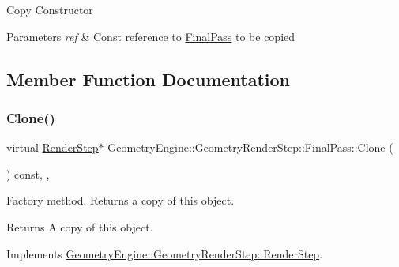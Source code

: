 Copy Constructor 
\begin{DoxyParams}{Parameters}
{\em ref} & Const reference to \mbox{\hyperlink{class_geometry_engine_1_1_geometry_render_step_1_1_final_pass}{Final\+Pass}} to be copied \\
\hline
\end{DoxyParams}


\subsection{Member Function Documentation}
\mbox{\label{class_geometry_engine_1_1_geometry_render_step_1_1_final_pass_a6633ed9c32944cc390d2b0ab32225845}} 
\subsubsection{\texorpdfstring{Clone()}{Clone()}}
{\footnotesize\ttfamily virtual \mbox{\hyperlink{class_geometry_engine_1_1_geometry_render_step_1_1_render_step}{Render\+Step}}$\ast$ Geometry\+Engine\+::\+Geometry\+Render\+Step\+::\+Final\+Pass\+::\+Clone (\begin{DoxyParamCaption}{ }\end{DoxyParamCaption}) const\hspace{0.3cm}{\ttfamily [inline]}, {\ttfamily [override]}, {\ttfamily [virtual]}}

Factory method. Returns a copy of this object. \begin{DoxyReturn}{Returns}
A copy of this object. 
\end{DoxyReturn}


Implements \mbox{\hyperlink{class_geometry_engine_1_1_geometry_render_step_1_1_render_step_afe33ea9d82c5be11f55af7d39691d44b}{Geometry\+Engine\+::\+Geometry\+Render\+Step\+::\+Render\+Step}}.

\mbox{\label{class_geometry_engine_1_1_geometry_render_step_1_1_final_pass_a4ae9bc7bbc603ec3fd5c7681cc20e8f0}} 
